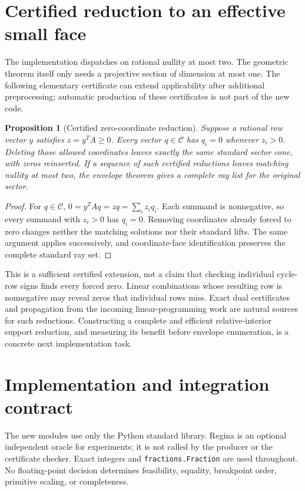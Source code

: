 \documentclass[11pt]{article}
\newtheorem{proposition}[theorem]{Proposition}
\theoremstyle{definition}
\theoremstyle{remark}
\newcommand{\cone}{\mathcal C}\newcommand{\stdcone}{\mathcal K}
\begin{document}
\section{Certified reduction to an effective small face}
\label{sec:facialreduction}

The implementation dispatches on rational nullity at most two. The geometric
theorem itself only needs a projective section of dimension at most one.
The following elementary certificate can extend applicability after additional
preprocessing; automatic production of these certificates is not part of the
new code.

\begin{proposition}[Certified zero-coordinate reduction]
\label{prop:zeros}
Suppose a rational row vector $y$ satisfies $z=y^TA\ge0$. Every vector
$q\in\cone$ has $q_i=0$ whenever $z_i>0$. Deleting those allowed coordinates
leaves exactly the same standard sector cone, with zeros reinserted. If a
sequence of such certified reductions leaves matching nullity at most two,
the envelope theorem gives a complete ray list for the original sector.
\end{proposition}

\begin{proof}
For $q\in\cone$, $0=y^TAq=zq=\sum_i z_iq_i$. Each summand is nonnegative,
so every summand with $z_i>0$ has $q_i=0$. Removing coordinates already forced
to zero changes neither the matching solutions nor their standard lifts.
The same argument applies successively, and coordinate-face identification
preserves the complete standard ray set.
\end{proof}

This is a sufficient certified extension, not a claim that checking individual
cycle-row signs finds every forced zero. Linear combinations whose resulting
row is nonnegative may reveal zeros that individual rows miss. Exact dual certificates and
propagation from the incoming linear-programming work are natural sources
for such reductions.\cite{incomingdual} Constructing a complete and efficient
relative-interior support reduction, and measuring its benefit before envelope
enumeration, is a concrete next implementation task.

\section{Implementation and integration contract}
\label{sec:implementation}

The new modules use only the Python standard library. Regina is an optional
independent oracle for experiments; it is not called by the producer or the
certificate checker. Exact integers and \texttt{fractions.Fraction} are used
throughout. No floating-point decision determines feasibility, equality,
breakpoint order, primitive scaling, or completeness.
\end{document}
